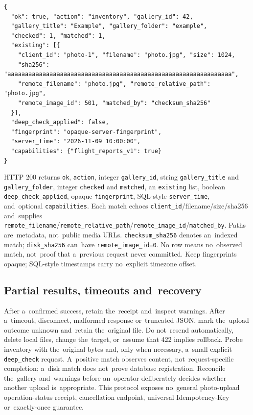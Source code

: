 \documentclass[11pt,a4paper]{article}
\newcommand{\codeword}[1]{\nolinkurl{#1}}
\begin{document}
\begin{lstlisting}[language={}]
{
  "ok": true, "action": "inventory", "gallery_id": 42,
  "gallery_title": "Example", "gallery_folder": "example",
  "checked": 1, "matched": 1,
  "existing": [{
    "client_id": "photo-1", "filename": "photo.jpg", "size": 1024,
    "sha256": "aaaaaaaaaaaaaaaaaaaaaaaaaaaaaaaaaaaaaaaaaaaaaaaaaaaaaaaaaaaaaaaa",
    "remote_filename": "photo.jpg", "remote_relative_path": "photo.jpg",
    "remote_image_id": 501, "matched_by": "checksum_sha256"
  }],
  "deep_check_applied": false,
  "fingerprint": "opaque-server-fingerprint",
  "server_time": "2026-11-09 10:00:00",
  "capabilities": {"flight_reports_v1": true}
}
\end{lstlisting}

HTTP 200 returns \codeword{ok}, \codeword{action}, integer \codeword{gallery_id}, string
\codeword{gallery_title} and \codeword{gallery_folder}, integer \codeword{checked} and
\codeword{matched}, an \codeword{existing} list, boolean \codeword{deep_check_applied},
opaque \codeword{fingerprint}, SQL-style \codeword{server_time}, and~optional
\codeword{capabilities}. Each match echoes \codeword{client_id}/filename/size/sha256
and~supplies
\codeword{remote_filename}/\codeword{remote_relative_path}/\codeword{remote_image_id}/\codeword{matched_by}.
Paths are~metadata, not~public media URLs. \codeword{checksum_sha256} denotes an~indexed
match; \codeword{disk_sha256} can~have \codeword{remote_image_id=0}. No row means
no~observed match, not~proof that a~previous request never committed. Keep fingerprints
opaque; SQL-style timestamps carry no~explicit timezone offset.

\subsection{\texorpdfstring{Partial results, timeouts and~recovery}{Partial results, timeouts and recovery}}

\label{api352:recovery}

After a~confirmed success, retain the~receipt and~inspect warnings. After a~timeout,
disconnect, malformed response or~truncated JSON, mark the~upload outcome unknown and~retain
the~original file. Do not~resend automatically, delete local files, change the~target,
or~assume that 422 implies rollback. Probe inventory with the~original bytes and, only when
necessary, a~small explicit \codeword{deep_check} request. A~positive match observes
content, not~request-specific completion; a~disk match does not~prove database registration.
Reconcile the~gallery and~warnings before an~operator deliberately decides whether another
upload is~appropriate. This protocol exposes no~general photo-upload operation-status
receipt, cancellation endpoint, universal Idempotency-Key or~exactly-once guarantee.
\end{document}
